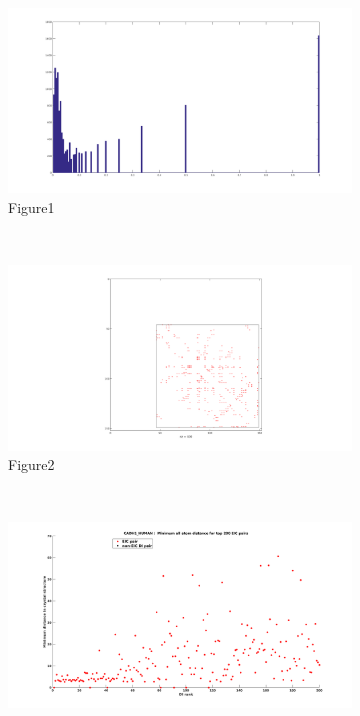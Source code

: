 \documentclass[10pt]{article}\usepackage[]{graphicx}\usepackage[]{color}
\theoremstyle{plain}
\begin{document}
\begin{multicols*}{2}

  \begin{figure}[p]
    \centering
    \begin{subfigure}[b]{.49\textwidth}
      \includegraphics[width=\textwidth, trim= 4cm -2cm 4cm 2cm, clip]{../figures/fig1}
      \caption{Figure1}
      \label{fig:fig1}
    \end{subfigure}~
    \begin{subfigure}[b]{.5\textwidth}
      \includegraphics[width=\textwidth, trim= 10cm 0 10cm 0, clip]{../figures/fig2}
      \caption{Figure2}
      \label{fig:fig2}
    \end{subfigure}\\
    \begin{subfigure}[b]{.49\textwidth}
      \includegraphics[width=\textwidth, trim= 4cm -2cm 4cm 2cm, clip]{../figures/fig3}

\end{subfigure}
\end{figure}
\end{multicols*}
\end{document}
